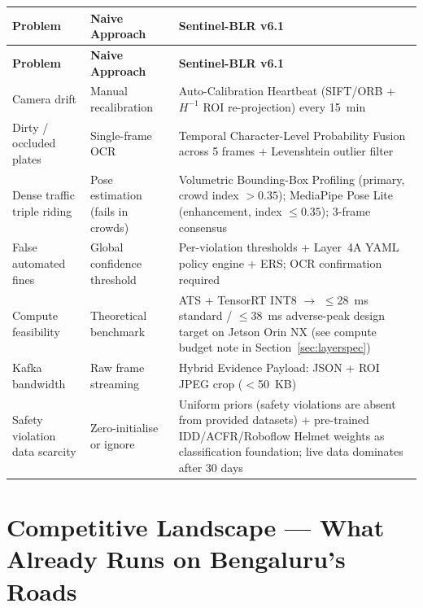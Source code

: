 \documentclass[11pt,a4paper]{article}
\begin{document}
\begin{longtable}{L{3.2cm} L{4.5cm} L{7cm}}
    \toprule
    \color{white}\textbf{Problem} & \color{white}\textbf{Naive Approach} & \color{white}\textbf{Sentinel-BLR v6.1} \\
    \midrule
    \endfirsthead
    \toprule
    \color{white}\textbf{Problem} & \color{white}\textbf{Naive Approach} & \color{white}\textbf{Sentinel-BLR v6.1} \\
    \midrule
    \endhead
    \bottomrule
    \endfoot

    Camera drift & Manual recalibration & Auto-Calibration Heartbeat (SIFT/ORB + $H^{-1}$ ROI re-projection) every 15~min \\
    Dirty / occluded plates & Single-frame OCR & Temporal Character-Level Probability Fusion across 5 frames + Levenshtein outlier filter \\
    Dense traffic triple riding & Pose estimation (fails in crowds) & Volumetric Bounding-Box Profiling (primary, crowd index $> 0.35$); MediaPipe Pose Lite (enhancement, index $\leq 0.35$); 3-frame consensus \\
    False automated fines & Global confidence threshold & Per-violation thresholds + Layer~4A YAML policy engine + ERS; OCR confirmation required \\
    Compute feasibility & Theoretical benchmark & ATS + TensorRT INT8 $\rightarrow$ $\leq$28~ms standard / $\leq$38~ms adverse-peak design target on Jetson Orin NX (see compute budget note in Section~\ref{sec:layerspec}) \\
    Kafka bandwidth & Raw frame streaming & Hybrid Evidence Payload: JSON + ROI JPEG crop ($<$50~KB) \\
    Safety violation data scarcity & Zero-initialise or ignore & Uniform priors (safety violations are absent from provided datasets) + pre-trained IDD/ACFR/Roboflow Helmet weights as classification foundation; live data dominates after 30 days \\
\end{longtable}

\section{Competitive Landscape — What Already Runs on Bengaluru's Roads}
\label{sec:competitive}
\end{document}
